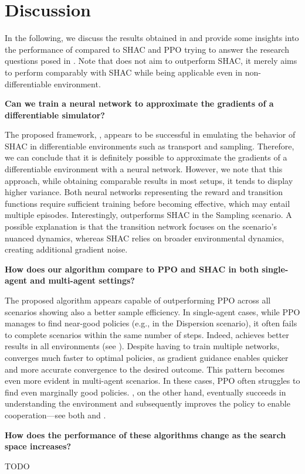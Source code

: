 \section{Discussion}
In the following, we discuss the results obtained in  and provide some insights into the performance of \fname{} compared to SHAC and PPO trying to answer the research questions posed in .
Note that \fname{} does not aim to outperform SHAC, it merely aims to perform comparably with SHAC while being applicable even in non-differentiable environment. 
\begin{center}
 \textbf{Can we train a neural network to approximate the gradients of a differentiable simulator?}
\end{center}

The proposed framework, \fname{}, appears to be successful in emulating the behavior of SHAC in differentiable environments such as transport and sampling. 
Therefore, we can conclude that it is definitely possible to approximate the gradients of a differentiable environment with a neural network. 
However, we note that this approach, while obtaining comparable results in most setups, it tends to display higher variance. 
Both neural networks representing the reward and transition functions require sufficient training before becoming effective, which may entail multiple episodes. Interestingly, \fname{} outperforms SHAC in the Sampling scenario. A possible explanation is that the transition network focuses on the scenario's nuanced dynamics, whereas SHAC relies on broader environmental dynamics, creating additional gradient noise.
\begin{center}
 \textbf{How does our algorithm compare to PPO and SHAC in both single-agent and multi-agent settings?}
\end{center}
The proposed algorithm appears capable of outperforming PPO across all scenarios showing also a better sample efficiency.
In single-agent cases, while PPO manages to find near-good policies (e.g., in the Dispersion scenario), 
it often fails to complete scenarios within the same number of steps. 
Indeed, \fname{} achieves better results in all environments (see ). 
Despite having to train multiple networks, \fname{} converges much faster to optimal policies, 
as gradient guidance enables quicker and more accurate convergence to the desired outcome. 
This pattern becomes even more evident in multi-agent scenarios. 
In these cases, PPO often struggles to find even marginally good policies. 
\fname{}, on the other hand, eventually succeeds in understanding the environment and subsequently improves the policy to enable cooperation---see both  and .
\begin{center}
 \textbf{How does the performance of these algorithms change as the search space increases?}
\end{center}
TODO
